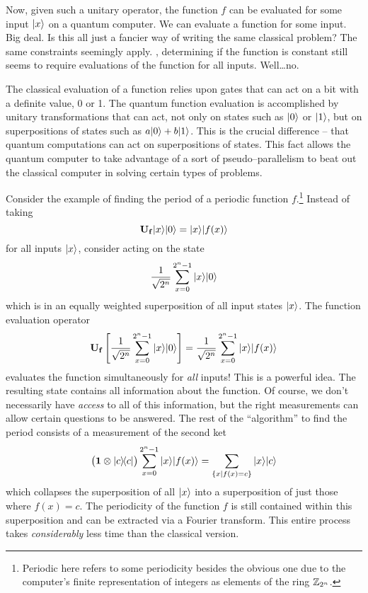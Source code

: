 Now, given such a unitary operator, the function $f$ can be 
evaluated for some input ${|{x}\rangle}$ on a quantum computer.
We can evaluate a function for some input.
Big deal.  Is this all just a fancier way of writing the same
classical problem?  
The same constraints seemingly apply. \ie, determining if the
function is constant still seems to require evaluations of the
function for all inputs.  Well\dots no.

The classical evaluation of a function relies upon gates that
can act on a bit with a definite value, 0 or 1.  The quantum
function evaluation is accomplished by unitary transformations
that can act, not only on states such as ${|{0}\rangle}$ or
${|{1}\rangle}$, but on superpositions of states such as 
$a{|{0}\rangle}+b{|{1}\rangle}$.  This is the crucial difference -- that 
quantum computations can act on superpositions of states.  
This fact allows the quantum computer to take advantage of a 
sort of pseudo--parallelism to beat out the classical computer
in solving certain types of problems.

Consider the example of finding the period of a periodic function 
$f$.\footnote{Periodic here refers to some periodicity besides the
obvious one due to the computer's finite representation of integers
as elements of the ring ${\mathbb{Z}}_{2^n}$.}
Instead of taking 
\begin{equation}
{\bf U_f}{|{x}\rangle}{|{0}\rangle} = {|{x}\rangle}{|{f(x)}\rangle}
\end{equation}
for all inputs ${|{x}\rangle}$, consider acting on the state
\begin{equation}
\frac{1}{\sqrt{2^n}}\sum_{x=0}^{2^n-1}{|{x}\rangle}{|{0}\rangle}
\end{equation}
which is in an equally weighted superposition of all input
states ${|{x}\rangle}$.  The function evaluation operator
\begin{equation}
{\bf U_f} \left\lbrack
\frac{1}{\sqrt{2^n}}\sum_{x=0}^{2^n-1}{|{x}\rangle}{|{0}\rangle}
\right\rbrack
= 
\frac{1}{\sqrt{2^n}}\sum_{x=0}^{2^n-1}{|{x}\rangle}{|{f(x)}\rangle}
\end{equation}
evaluates the function simultaneously for \emph{all} inputs!
This is a powerful idea.  The resulting state contains all
information about the function.  Of course, we don't necessarily
have {\sl access} to all of this information, but the right 
measurements can allow certain questions to be answered.
The rest of the ``algorithm'' to find the period consists
of a measurement of the second ket
\begin{equation}
\bigl(
{\bf 1}\otimes{|{c}\rangle\!\langle{c}|}
\bigr)
\sum_{x=0}^{2^n-1}{|{x}\rangle}{|{f(x)}\rangle}
= \sum_{\lbrace x|f(x)=c\rbrace} {|{x}\rangle}{|{c}\rangle}
\end{equation}
which
collapses the superposition of all ${|{x}\rangle}$ into a 
superposition of just those
where $f(x)=c$.  The periodicity of the function $f$ is still
contained within this superposition and can be extracted via
a Fourier transform.
This entire process takes {\sl considerably} less time than the classical
version.


